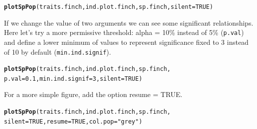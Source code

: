 \documentclass[12pt]{article}\usepackage[]{graphicx}\usepackage[]{color}
\makeatletter
\newcommand{\hlnum}[1]{\textcolor[rgb]{0.686,0.059,0.569}{#1}}%
\newcommand{\hlstr}[1]{\textcolor[rgb]{0.192,0.494,0.8}{#1}}%
\newcommand{\hlstd}[1]{\textcolor[rgb]{0.345,0.345,0.345}{#1}}%
\newcommand{\hlkwc}[1]{\textcolor[rgb]{0.333,0.667,0.333}{#1}}%
\newcommand{\hlkwd}[1]{\textcolor[rgb]{0.737,0.353,0.396}{\textbf{#1}}}%
\newenvironment{kframe}{%
 \def\at@end@of@kframe{}%
 \ifinner\ifhmode%
  \def\at@end@of@kframe{\end{minipage}}%
  \begin{minipage}{\columnwidth}%
 \fi\fi%
 \def\FrameCommand##1{\hskip\@totalleftmargin \hskip-\fboxsep
 \colorbox{shadecolor}{##1}\hskip-\fboxsep
     \hskip-\linewidth \hskip-\@totalleftmargin \hskip\columnwidth}%
 \MakeFramed {\advance\hsize-\width
   \@totalleftmargin\z@ \linewidth\hsize
   \@setminipage}}%
 {\par\unskip\endMakeFramed%
 \at@end@of@kframe}
\newenvironment{knitrout}{}{} %
\makeatother
\begin{document}
\begin{knitrout}
\color{fgcolor}\begin{kframe}
\begin{alltt}
\hlkwd{plotSpPop}\hlstd{(traits.finch, ind.plot.finch, sp.finch,} \hlkwc{silent} \hlstd{=} \hlnum{TRUE}\hlstd{)}
\end{alltt}


{\ttfamily\noindent\bfseries{}}\end{kframe}
\end{knitrout}

If we change the value of two arguments we can see some significant relationships. Here let's try a more permissive threshold: alpha = 10\% instead of 5\% (\texttt{p.val}) and define a lower minimum of values to represent significance  fixed to 3 instead of 10 by default (\texttt{min.ind.signif}). 

\newpage

\begin{knitrout}
\color{fgcolor}\begin{kframe}
\begin{alltt}
\hlkwd{plotSpPop}\hlstd{(traits.finch, ind.plot.finch, sp.finch,}
      \hlkwc{p.val} \hlstd{=} \hlnum{0.1}\hlstd{,} \hlkwc{min.ind.signif} \hlstd{=} \hlnum{3}\hlstd{,} \hlkwc{silent} \hlstd{=} \hlnum{TRUE}\hlstd{)}
\end{alltt}


{\ttfamily\noindent\bfseries{}}\end{kframe}
\end{knitrout}

\newpage

For a more simple figure, add the option resume = TRUE. 
\begin{knitrout}
\color{fgcolor}\begin{kframe}
\begin{alltt}
\hlkwd{plotSpPop}\hlstd{(traits.finch, ind.plot.finch, sp.finch,}
      \hlkwc{silent} \hlstd{=} \hlnum{TRUE}\hlstd{,} \hlkwc{resume} \hlstd{=} \hlnum{TRUE}\hlstd{,} \hlkwc{col.pop} \hlstd{=} \hlstr{"grey"}\hlstd{)}
\end{alltt}


{\ttfamily\noindent\bfseries{}}\end{kframe}
\end{knitrout}
\end{document}
